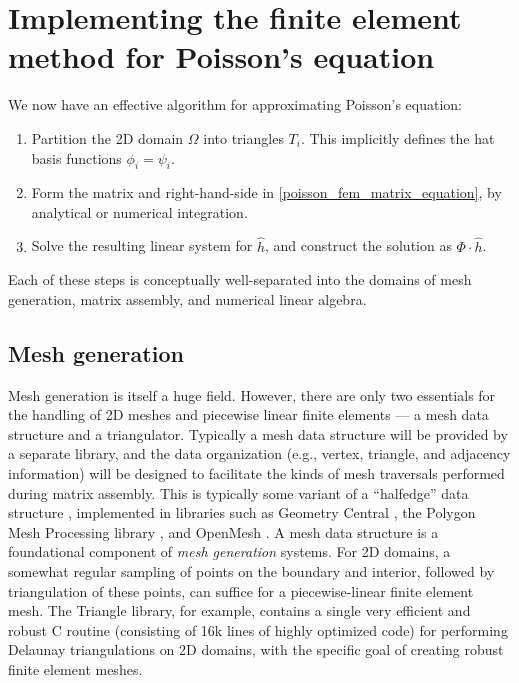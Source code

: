 \section{Implementing the finite element method for Poisson's equation}
We now have an effective algorithm for approximating Poisson's equation:
\begin{enumerate}
    \item Partition the 2D domain $\Omega$ into triangles $T_i$. This implicitly defines the hat basis functions $\phi_i = \psi_i$.
    \item Form the matrix and right-hand-side in \eqref{poisson_fem_matrix_equation}, by analytical or numerical integration.
    \item Solve the resulting linear system for $\hat{h}$, and construct the solution as $\Phi\cdot\hat{h}$.
\end{enumerate}
Each of these steps is conceptually well-separated into the domains of
mesh generation, matrix assembly, and numerical linear algebra.

\subsection{Mesh generation}
Mesh generation is itself a huge field. However, there are only two essentials for the handling of 2D meshes and piecewise linear finite elements
--- a mesh data structure and a triangulator. Typically a mesh data structure will be provided by a separate library,
and the data organization (e.g., vertex, triangle, and adjacency information) will be designed to facilitate the kinds
of mesh traversals performed during matrix assembly. This is typically some variant of a ``halfedge'' data structure \cite{polygon_mesh_processing},
implemented in libraries such as Geometry Central \cite{geometry_central},
the Polygon Mesh Processing library \cite{polygon_mesh_processing_library}, and OpenMesh \cite{openmesh}.
A mesh data structure is a foundational component of \textit{mesh generation} systems. For 2D domains, a somewhat regular sampling of points on the boundary
and interior, followed by triangulation of these points, can suffice for a piecewise-linear finite element mesh.
The Triangle \cite{triangle} library, for example, contains a single very efficient and robust C routine (consisting of 16k lines of highly optimized code)
for performing Delaunay triangulations \cite{orourke}
on 2D domains,
with the specific goal of creating robust finite element meshes.


